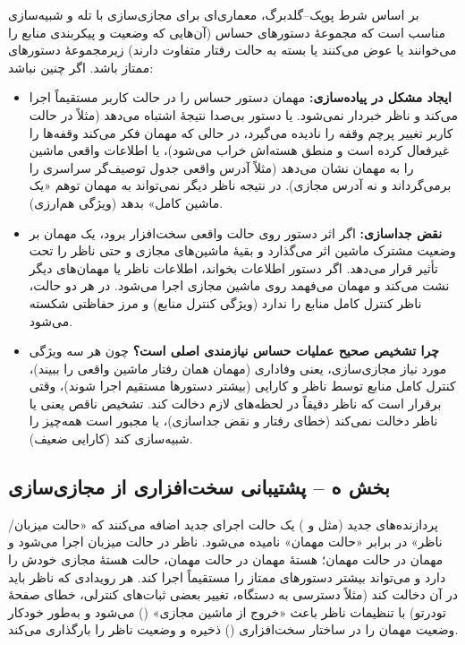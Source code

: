 بر اساس شرط پوپک–گلدبرگ، معماری‌ای برای مجازی‌سازی با تله و شبیه‌سازی مناسب است که مجموعهٔ دستورهای حساس (آن‌هایی که وضعیت و پیکربندی منابع را می‌خوانند یا عوض می‌کنند یا بسته به حالت رفتار متفاوت دارند) زیرمجموعهٔ دستورهای ممتاز باشد. اگر چنین نباشد:
\begin{itemize}
  \item \textbf{ایجاد مشکل در پیاده‌سازی:} مهمان دستور حساس را در حالت کاربر مستقیماً اجرا می‌کند و ناظر خبردار نمی‌شود. یا دستور بی‌صدا نتیجهٔ اشتباه می‌دهد (مثلاً  در حالت کاربر تغییر پرچم وقفه را نادیده می‌گیرد، در حالی که مهمان فکر می‌کند وقفه‌ها را غیرفعال کرده است و منطق هسته‌اش خراب می‌شود)، یا اطلاعات واقعی ماشین را به مهمان نشان می‌دهد (مثلاً  آدرس واقعی جدول توصیف‌گر سراسری را برمی‌گرداند و نه آدرس مجازی). در نتیجه ناظر دیگر نمی‌تواند به مهمان توهم «یک ماشین کامل» بدهد (ویژگی هم‌ارزی).
  \item \textbf{نقض جداسازی:} اگر اثر دستور روی حالت واقعی سخت‌افزار برود، یک مهمان بر وضعیت مشترک ماشین اثر می‌گذارد و بقیهٔ ماشین‌های مجازی و حتی ناظر را تحت تأثیر قرار می‌دهد. اگر دستور اطلاعات بخواند، اطلاعات ناظر یا مهمان‌های دیگر نشت می‌کند و مهمان می‌فهمد روی ماشین مجازی اجرا می‌شود. در هر دو حالت، ناظر کنترل کامل منابع را ندارد (ویژگی کنترل منابع) و مرز حفاظتی شکسته می‌شود.
  \item \textbf{چرا تشخیص صحیح عملیات حساس نیازمندی اصلی است؟} چون هر سه ویژگی مورد نیاز مجازی‌سازی، یعنی وفاداری (مهمان همان رفتار ماشین واقعی را ببیند)، کنترل کامل منابع توسط ناظر و کارایی (بیشتر دستورها مستقیم اجرا شوند)، وقتی برقرار است که ناظر دقیقاً در لحظه‌های لازم دخالت کند. تشخیص ناقص یعنی یا ناظر دخالت نمی‌کند (خطای رفتار و نقض جداسازی)، یا مجبور است همه‌چیز را شبیه‌سازی کند (کارایی ضعیف).
\end{itemize}

\subsection*{بخش ه – پشتیبانی سخت‌افزاری از مجازی‌سازی}

پردازنده‌های جدید (مثل  و ) یک حالت اجرای جدید اضافه می‌کنند که «حالت میزبان/ناظر» در برابر «حالت مهمان» نامیده می‌شود. ناظر در حالت میزبان اجرا می‌شود و مهمان در حالت مهمان؛ هستهٔ مهمان در حالت مهمان، حالت هستهٔ مجازی خودش را دارد و می‌تواند بیشتر دستورهای ممتاز را مستقیماً اجرا کند. هر رویدادی که ناظر باید در آن دخالت کند (مثلاً دسترسی به دستگاه، تغییر بعضی ثبات‌های کنترلی، خطای صفحهٔ تودرتو) با تنظیمات ناظر باعث «خروج از ماشین مجازی» () می‌شود و  به‌طور خودکار وضعیت مهمان را در ساختار سخت‌افزاری () ذخیره و وضعیت ناظر را بارگذاری می‌کند.

